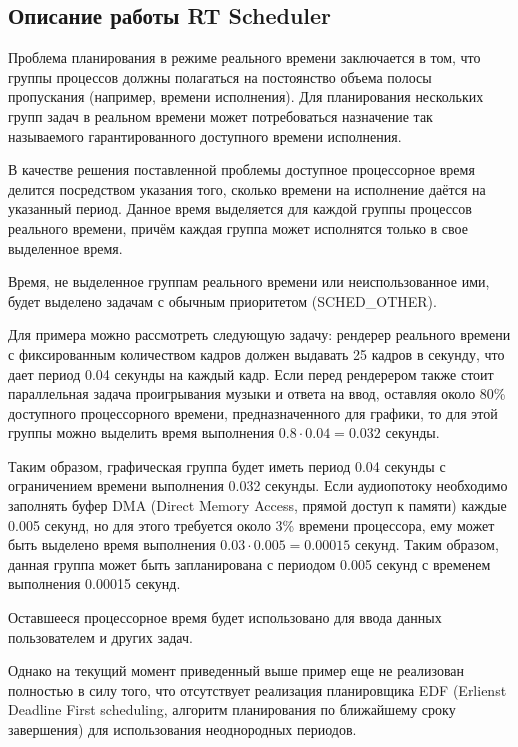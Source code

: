 \subsection{Описание работы RT Scheduler}
Проблема планирования в режиме реального времени заключается в том, что группы процессов должны полагаться на постоянство объема полосы пропускания (например, времени исполнения). Для планирования нескольких групп задач в реальном времени может потребоваться назначение так называемого гарантированного доступного времени исполнения. \cite{linuxkerneldocs}

В качестве решения поставленной проблемы доступное процессорное время делится посредством указания того, сколько времени на исполнение даётся на указанный период. Данное время выделяется для каждой группы процессов реального времени, причём каждая группа может исполнятся только в свое выделенное время. \cite{linuxkerneldocs}

Время, не выделенное группам реального времени или неиспользованное ими, будет выделено задачам с обычным приоритетом (SCHED\_OTHER). \cite{linuxkerneldocs}

Для примера можно рассмотреть следующую задачу: рендерер реального времени с фиксированным количеством кадров должен выдавать 25 кадров в секунду, что дает период 0.04 секунды на каждый кадр. Если перед рендерером также стоит параллельная задача проигрывания музыки и ответа на ввод, оставляя около 80\% доступного процессорного времени, предназначенного для графики, то для этой группы можно выделить время выполнения $ 0.8 \cdot 0.04 = 0.032 $ секунды.

Таким образом, графическая группа будет иметь период 0.04 секунды с ограничением времени выполнения 0.032 секунды. Если аудиопотоку необходимо заполнять буфер DMA (Direct Memory Access, прямой доступ к памяти) каждые 0.005 секунд, но для этого требуется около 3\% времени процессора, ему может быть выделено время выполнения $ 0.03 \cdot 0.005 = 0.00015 $ секунд. Таким образом, данная группа может быть запланирована с периодом 0.005 секунд с временем выполнения 0.00015 секунд.

Оставшееся процессорное время будет использовано для ввода данных пользователем и других задач.

Однако на текущий момент приведенный выше пример еще не реализован полностью в силу того, что отсутствует реализация планировщика EDF (Erlienst Deadline First scheduling, алгоритм планирования по ближайшему сроку завершения) для использования неоднородных периодов. \cite{linuxkerneldocs}

